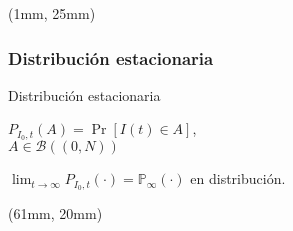 \begin{frame}
    \begin{textblock*}{60mm}(1mm, 25mm)
        \frametitle{Distribución estacionaria}
        \begin{greenbox}{Distribución estacionaria}
            \begin{list}{\bullet}{}
                \item
                    $
                        P_{I_0,t}(A)
                        = \Pr[I(t)\in A]
                    $,
                    \\
                    $A \in \mathcal{B}((0, N))$
                \item
                    $
                        \displaystyle
                        \lim_{t \to \infty}
                        P_{I_0,t}(\cdot)
                        = \mathbb{P}_{\infty}(\cdot)
                    $ en distribución.
            \end{list}
        \end{greenbox}
    \end{textblock*}
    \begin{textblock*}{60mm}(61mm, 20mm)
    \end{textblock*}
\end{frame}
